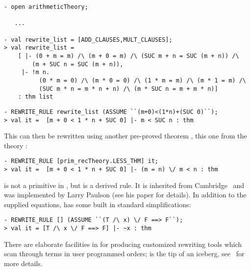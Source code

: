\begin{session}\begin{verbatim}
- open arithmeticTheory;

   ...

- val rewrite_list = [ADD_CLAUSES,MULT_CLAUSES];
> val rewrite_list =
    [ |- (0 + m = m) /\ (m + 0 = m) /\ (SUC m + n = SUC (m + n)) /\
        (m + SUC n = SUC (m + n)),
     |- !m n.
          (0 * m = 0) /\ (m * 0 = 0) /\ (1 * m = m) /\ (m * 1 = m) /\
          (SUC m * n = m * n + n) /\ (m * SUC n = m + m * n)]
    : thm list
\end{verbatim}\end{session}

\begin{session}\begin{verbatim}
- REWRITE_RULE rewrite_list (ASSUME ``(m+0)<(1*n)+(SUC 0)``);
> val it =  [m + 0 < 1 * n + SUC 0] |- m < SUC n : thm
\end{verbatim}\end{session}

\noindent
This can then be rewritten using another pre-proved theorem
, this one from the theory :

\begin{session}\begin{verbatim}
- REWRITE_RULE [prim_recTheory.LESS_THM] it;
> val it =  [m + 0 < 1 * n + SUC 0] |- (m = n) \/ m < n : thm
\end{verbatim}\end{session}

     is not a primitive in \HOL, but is a derived
    rule. It is inherited from Cambridge \LCF\ and was implemented by
    Larry Paulson (see his paper \cite{lcp_rewrite} for details). In
    addition to the supplied equations, \ml{REWRITE\_RULE} has some
    built in standard simplifications:

\begin{session}\begin{verbatim}
- REWRITE_RULE [] (ASSUME ``(T /\ x) \/ F ==> F``);
> val it = [T /\ x \/ F ==> F] |- ~x : thm
\end{verbatim}\end{session}

    There are elaborate facilities in \HOL{} for producing customized
    rewriting tools which scan through terms in user programmed
    orders; \ml{REWRITE\_RULE} is the tip of an iceberg, see
    \DESCRIPTION\ for more details.

